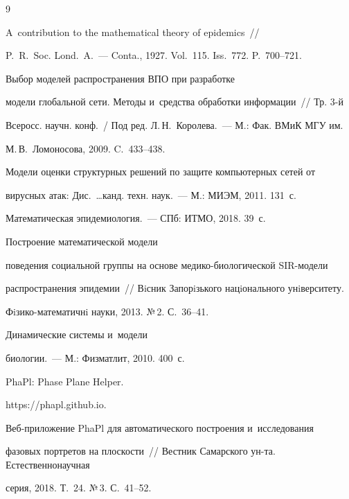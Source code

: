 {\small\frenchspacing


{%




\begin{thebibliography}{9}


 




 A~contribution to the mathematical theory of epidemics~/\!\!/ 


P.~R.~Soc. Lond.~A.~--- Conta., 1927. Vol.~115. Iss.~772. P.~700--721. 




 Выбор моделей распространения ВПО при разработке 


модели глобальной сети. Методы и~средства обработки информации~/\!\!/ Тр. 3-й 


Всеросс. научн. конф.~/ Под ред. Л.\,Н.~Королева.~--- М.: Фак. ВМиК МГУ им.\ 


М.\,В.~Ломоносова, 2009. C.~433--438. 




 Модели оценки структурных решений по защите компьютерных сетей от 


вирусных атак: Дис.\ \ldots канд. техн. наук.~--- М.: МИЭМ, 2011. 131~с.




 Математическая эпидемиология.~--- СПб: ИТМО, 2018. 39~с. 




 Построение математической модели 


поведения социальной группы на основе ме\-ди\-ко-био\-ло\-ги\-че\-ской SIR-мо\-де\-ли 


распространения эпидемии~/\!\!/ Вiсник Запорiзького нацiонального унiверситету. 


Фi\-зи\-ко-ма\-те\-ма\-тичнi науки, 2013. №\,2. С.~36--41. 




 Динамические сис\-те\-мы и~модели 


био\-ло\-гии.~--- М.: Физматлит, 2010. 400~с. 




PhaPl: Phase Plane Helper. 


 {\sf https://phapl.github.io}.




 Веб-приложение PhaPl для автоматического построения и~исследования 


фазовых портретов на плос\-кости~/\!\!/ Вестник Самарского ун-та. Естественнонаучная 


серия, 2018. Т.~24. №\,3. С.~41--52.


     \end{thebibliography}


} }
